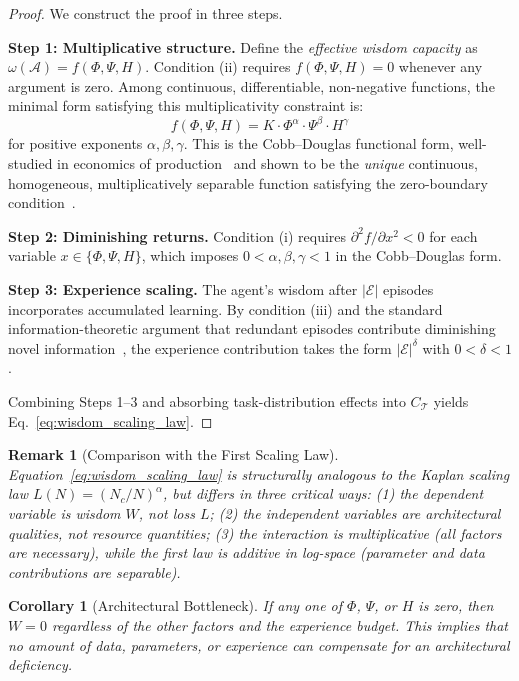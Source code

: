 \documentclass{article}
\newtheorem{corollary}[theorem]{Corollary}
\newtheorem{remark}{Remark}
\newcommand{\cA}{\mathcal{A}}
\newcommand{\cT}{\mathcal{T}}
\newcommand{\cE}{\mathcal{E}}
\begin{document}
\begin{proof}
We construct the proof in three steps.

\textbf{Step 1: Multiplicative structure.}
Define the \emph{effective wisdom capacity} as $\omega(\cA) = f(\Phi, \Psi, H)$.
Condition (ii) requires $f(\Phi, \Psi, H) = 0$ whenever any argument is zero.
Among continuous, differentiable, non-negative functions, the minimal form satisfying this multiplicativity constraint is:
\begin{equation}
    f(\Phi, \Psi, H) = K \cdot \Phi^{\alpha} \cdot \Psi^{\beta} \cdot H^{\gamma}
    \label{eq:cobb_douglas}
\end{equation}
for positive exponents $\alpha, \beta, \gamma$.
This is the Cobb--Douglas functional form, well-studied in economics of production~\citep{cobb1928theory} and shown to be the \emph{unique} continuous, homogeneous, multiplicatively separable function satisfying the zero-boundary condition~\citep{mishra2007brief}.

\textbf{Step 2: Diminishing returns.}
Condition (i) requires $\partial^2 f / \partial x^2 < 0$ for each variable $x \in \{\Phi, \Psi, H\}$, which imposes $0 < \alpha, \beta, \gamma < 1$ in the Cobb--Douglas form.

\textbf{Step 3: Experience scaling.}
The agent's wisdom after $|\cE|$ episodes incorporates accumulated learning.
By condition (iii) and the standard information-theoretic argument that redundant episodes contribute diminishing novel information~\citep{cover2006elements}, the experience contribution takes the form $|\cE|^{\delta}$ with $0 < \delta < 1$.

Combining Steps 1--3 and absorbing task-distribution effects into $C_\cT$ yields Eq.~\ref{eq:wisdom_scaling_law}.
\end{proof}

\begin{remark}[Comparison with the First Scaling Law]
Equation~\ref{eq:wisdom_scaling_law} is structurally analogous to the Kaplan scaling law $L(N) = (N_c/N)^\alpha$, but differs in three critical ways:
(1) the dependent variable is wisdom $W$, not loss $L$;
(2) the independent variables are architectural qualities, not resource quantities;
(3) the interaction is multiplicative (all factors are necessary), while the first law is additive in log-space (parameter and data contributions are separable).
\end{remark}

\begin{corollary}[Architectural Bottleneck]
\label{cor:bottleneck}
If any one of $\Phi$, $\Psi$, or $H$ is zero, then $W = 0$ regardless of the other factors and the experience budget.
This implies that no amount of data, parameters, or experience can compensate for an architectural deficiency.
\end{corollary}
\end{document}
